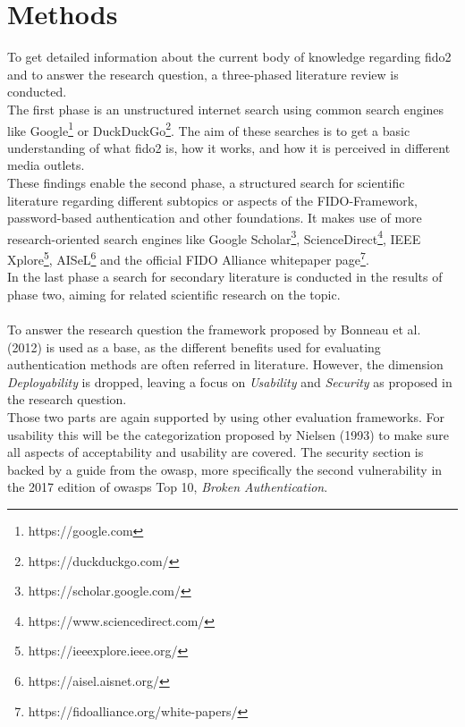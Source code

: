 
\section{Methods}
\label{sec:methods}

To get detailed information about the current body of knowledge regarding \ac{fido2} and to answer the research question, a three-phased literature review is conducted.\\
The first phase is an unstructured internet search using common search engines like Google\footnote{https://google.com} or DuckDuckGo\footnote{https://duckduckgo.com/}. The aim of these searches is to get a basic understanding of what \ac{fido2} is, how it works, and how it is perceived in different media outlets.\\
These findings enable the second phase, a structured search for scientific literature regarding different subtopics or aspects of the FIDO-Framework, password-based authentication and other foundations. It makes use of more research-oriented search engines like Google Scholar\footnote{https://scholar.google.com/}, ScienceDirect\footnote{https://www.sciencedirect.com/}, IEEE Xplore\footnote{https://ieeexplore.ieee.org/}, AISeL\footnote{https://aisel.aisnet.org/} and the official FIDO Alliance whitepaper page\footnote{https://fidoalliance.org/white-papers/}.\\
In the last phase a search for secondary literature is conducted in the results of phase two, aiming for related scientific research on the topic.\\
\\
To answer the research question the framework proposed by Bonneau et al. (2012) is used as a base, as the different benefits used for evaluating authentication methods are often referred in literature. However, the dimension \emph{Deployability} is dropped, leaving a focus on \emph{Usability} and \emph{Security} as proposed in the research question.\\
Those two parts are again supported by using other evaluation frameworks. For usability this will be the categorization proposed by Nielsen (1993) to make sure all aspects of acceptability and usability are covered. The security section is backed by a guide from the \ac{owasp}, more specifically the second vulnerability in the 2017 edition of \acp{owasp} Top 10, \emph{Broken Authentication}.